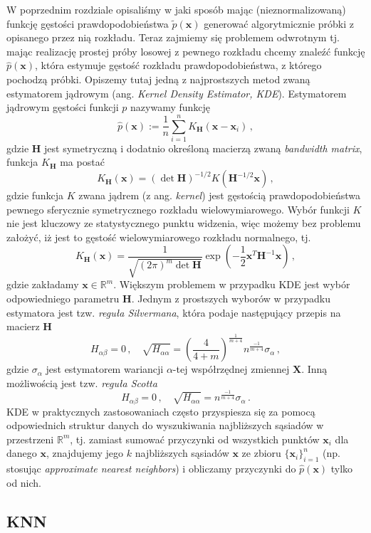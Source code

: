 \documentclass{myclass}
\begin{document}
W poprzednim rozdziale opisaliśmy w jaki sposób mając (nieznormalizowaną) funkcję gęstości
prawdopodobieństwa \(\tilde{p}(\bm{x})\) generować algorytmicznie próbki z opisanego przez nią
rozkładu. Teraz zajmiemy się problemem odwrotnym tj. mając realizację prostej próby losowej z
pewnego rozkładu chcemy znaleźć funkcję \(\hat{p}(\bm{x})\), która estymuje gęstość rozkładu
prawdopodobieństwa, z którego pochodzą próbki. Opiszemy tutaj jedną z najprostszych metod zwaną
estymatorem jądrowym (ang. \emph{Kernel Density Estimator, KDE}). Estymatorem jądrowym gęstości
funkcji \(p\) nazywamy funkcję
\[
\hat{p}(\bm{x}) := \frac{1}{n}\sum_{i=1}^n K_{\bm{H}}(\bm{x} - \bm{x}_i)\,,
\]
gdzie \(\bm{H}\) jest symetryczną i dodatnio określoną macierzą zwaną \textit{bandwidth matrix},
funkcja \(K_{\bm{H}}\) ma postać
\[
K_{\bm{H}}(\bm{x}) = (\det \bm{H})^{-1/2} K(\bm{H}^{-1/2}\bm{x})\,,
\]
gdzie funkcja \(K\) zwana jądrem (z ang. \textit{kernel}) jest gęstością prawdopodobieństwa pewnego
sferycznie symetrycznego rozkładu wielowymiarowego. Wybór funkcji \(K\) nie jest kluczowy ze
statystycznego punktu widzenia, więc możemy bez problemu założyć, iż jest to gęstość
wielowymiarowego rozkładu normalnego, tj.
\[
K_{\bm{H}}(\bm{x}) = \frac{1}{\sqrt{(2\pi)^m \det\bm{H}}} \exp\left(-\frac{1}{2} \bm{x}^T\bm{H}^{-1}\bm{x}\right)\,,
\]
gdzie zakładamy \(\bm{x} \in \mathbb{R}^m\). Większym problemem w przypadku KDE jest wybór
odpowiedniego parametru \(\bm{H}\). Jednym z prostszych wyborów w przypadku estymatora jest tzw.
\emph{reguła Silvermana}, która podaje następujący przepis na macierz \(\bm{H}\)
\[
H_{\alpha\beta} = 0\,,\quad \sqrt{H_{\alpha\alpha}} = \left(\frac{4}{4 + m}\right)^\frac{1}{m + 4} n^\frac{-1}{m + 4} \sigma_\alpha\,,
\] 
gdzie \(\sigma_\alpha\) jest estymatorem wariancji \(\alpha\)-tej współrzędnej zmiennej \(\bm{X}\).
Inną możliwością jest tzw. \emph{reguła Scotta}
\[
H_{\alpha\beta} = 0\,,\quad \sqrt{H_{\alpha\alpha}} = n^\frac{-1}{m+4} \sigma_\alpha\,.
\]
KDE w praktycznych zastosowaniach często przyspiesza się za pomocą odpowiednich struktur danych do
wyszukiwania najbliższych sąsiadów w przestrzeni \(\mathbb{R}^m\), tj. zamiast sumować przyczynki od
wszystkich punktów \(\bm{x}_i\) dla danego \(\bm{x}\), znajdujemy jego \(k\) najbliższych sąsiadów
\(\bm{x}\) ze zbioru \(\{\bm{x}_i\}_{i=1}^n\) (np. stosując \emph{approximate nearest neighbors}) i
obliczamy przyczynki do \(\hat{p}(\bm{x})\) tylko od nich.

\subsection{KNN}
\end{document}
